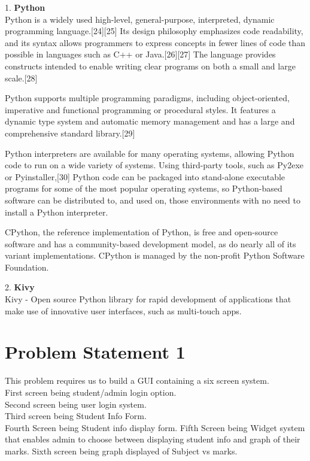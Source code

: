 \documentclass[11pt]{report}
\begin{document}
\begin{flushleft}
1. \textbf{Python}\\
Python is a widely used high-level, general-purpose, interpreted, dynamic programming language.[24][25] Its design philosophy emphasizes code readability, and its syntax allows programmers to express concepts in fewer lines of code than possible in languages such as C++ or Java.[26][27] The language provides constructs intended to enable writing clear programs on both a small and large scale.[28]

Python supports multiple programming paradigms, including object-oriented, imperative and functional programming or procedural styles. It features a dynamic type system and automatic memory management and has a large and comprehensive standard library.[29]

Python interpreters are available for many operating systems, allowing Python code to run on a wide variety of systems. Using third-party tools, such as Py2exe or Pyinstaller,[30] Python code can be packaged into stand-alone executable programs for some of the most popular operating systems, so Python-based software can be distributed to, and used on, those environments with no need to install a Python interpreter.

CPython, the reference implementation of Python, is free and open-source software and has a community-based development model, as do nearly all of its variant implementations. CPython is managed by the non-profit Python Software Foundation.
\end{flushleft}

\begin{flushleft}
2. \textbf{Kivy}\\
Kivy - Open source Python library for rapid development of applications
that make use of innovative user interfaces, such as multi-touch apps.

\end{flushleft}
\newpage
\section{Problem Statement 1}
	This problem requires us to build a GUI containing a six screen system.\\
	First screen being student/admin login option.\\ 		Second screen being user login system.\\
	Third screen being Student Info Form.\\
	Fourth Screen being Student info display form.
	Fifth Screen being Widget system that enables admin to choose between displaying student info and graph of their marks.
	Sixth screen being graph displayed of Subject vs marks.
\end{document}
